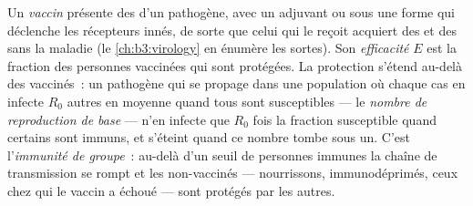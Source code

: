 \begin{definition}\label{def:b3:adaptive-immunity:vaccine}
Un \emph{vaccin} présente des  d'un pathogène, avec un adjuvant
ou sous une forme qui déclenche les récepteurs innés, de sorte que celui
qui le reçoit acquiert des  et des  sans la
maladie (le \cref{ch:b3:virology} en énumère les sortes). Son
\emph{efficacité} $E$ est la fraction des personnes vaccinées qui sont
protégées. La protection s'étend au-delà des vaccinés~: un pathogène qui
se propage dans une population où chaque cas en infecte $R_{0}$ autres
en moyenne quand tous sont susceptibles --- le \emph{nombre de
reproduction de base} --- n'en infecte que $R_{0}$ fois la fraction
susceptible quand certains sont immuns, et s'éteint quand ce nombre
tombe sous un. C'est l'\emph{immunité de groupe}~: au-delà d'un seuil de
personnes immunes la chaîne de transmission se rompt et les non-vaccinés
--- nourrissons, immunodéprimés, ceux chez qui le vaccin a échoué ---
sont protégés par les autres.
\end{definition}

